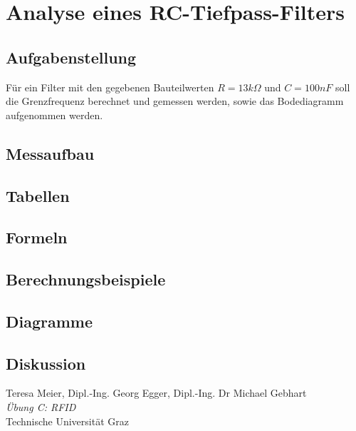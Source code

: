 \documentclass[12pt,a4paper,ngerman]{article}
\begin{document}
\pagebreak
\section{Analyse eines RC-Tiefpass-Filters}
\subsection{Aufgabenstellung}
Für ein Filter mit den gegebenen Bauteilwerten $R = 13k\Omega$ und $C = 100 nF$ soll die Grenzfrequenz berechnet und gemessen werden, sowie das Bodediagramm aufgenommen werden.

\subsection{Messaufbau}

\subsection{Tabellen}

\subsection{Formeln}

\subsection{Berechnungsbeispiele}

\subsection{Diagramme}

\subsection{Diskussion}


\begin{thebibliography}{9}

  Teresa Meier, Dipl.-Ing. Georg Egger, Dipl.-Ing. Dr Michael Gebhart\\
  \emph{Übung C: RFID}\\
  Technische Universität Graz
\end{thebibliography}

 



   
\end{document}
